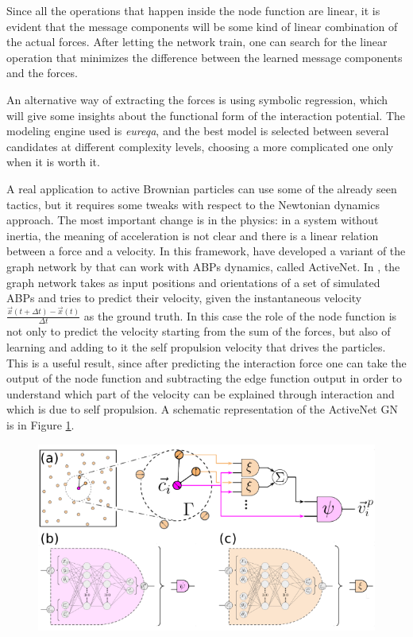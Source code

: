 \documentclass[../../master_thesis_np.tex]{subfiles}
\begin{document}
	Since all the operations that happen inside the node function are linear, it is evident that the message components will be some kind of linear combination of the actual forces. After letting the network train, one can search for the linear operation that minimizes the difference between the learned message components and the forces. 
	
	An alternative way of extracting the forces is using symbolic regression, which will give some insights about the functional form of the interaction potential. The modeling engine used is \emph{eureqa}, and the best model is selected between several candidates at different complexity levels, choosing a more complicated one only when it is worth it.
	
	A real application to active Brownian particles can use some of the already seen tactics, but it requires some tweaks with respect to the Newtonian dynamics approach. The most important change is in the physics: in a system without inertia, the meaning of acceleration is not clear and there is a linear relation between a force and a velocity. In this framework, \citeauthor{ruiz-garcia_discovering_2024} have developed a variant of the graph network by \citeauthor{cranmer_discovering_2020} that can work with ABPs dynamics, called ActiveNet. In \cite{ruiz-garcia_discovering_2024}, the graph network takes as input positions and orientations of a set of simulated ABPs and tries to predict their velocity, given the instantaneous velocity $\frac{\vec{x}(t + \Delta t) - \vec{x}(t)}{\Delta t}$ as the ground truth. In this case the role of the node function is not only to predict the velocity starting from the sum of the forces, but also of learning and adding to it the self propulsion velocity that drives the particles. This is a useful result, since after predicting the interaction force one can take the output of the node function and subtracting the edge function output in order to understand which part of the velocity can be explained through interaction and which is due to self propulsion.
	A schematic representation of the ActiveNet GN is in Figure \ref{fig:ruiz1}.
	\begin{figure}[htp]
		\centering
		\includegraphics[width=\singfigwidth]{ruiz1.png}
		\caption{\parencite{ruiz-garcia_discovering_2024}}
		\label{fig:ruiz1}
	\end{figure}
\end{document}
